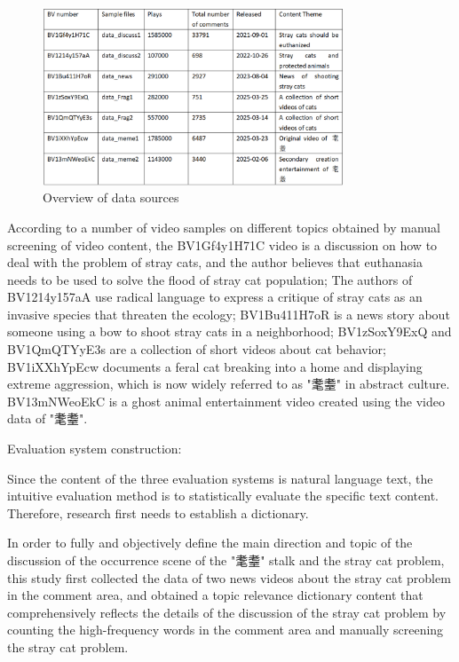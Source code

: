 \documentclass[12pt,a4paper]{ctexart}
\begin{document}
\begin{figure}[htbp]
    \centering
    \includegraphics[width=0.8\textwidth]{img/data_sources_2.png}
    \caption{Overview of data sources}
    \label{fig:data_sources_2}
\end{figure}
\newpage

According to a number of video samples on different topics obtained by manual screening of video content, the BV1Gf4y1H71C video is a discussion on how to deal with the problem of stray cats, and the author believes that euthanasia needs to be used to solve the flood of stray cat population; The authors of BV1214y157aA use radical language to express a critique of stray cats as an invasive species that threaten the ecology; BV1Bu411H7oR is a news story about someone using a bow to shoot stray cats in a neighborhood; BV1zSoxY9ExQ and BV1QmQTYyE3s are a collection of short videos about cat behavior; BV1iXXhYpEcw documents a feral cat breaking into a home and displaying extreme aggression, which is now widely referred to as "耄耋" in abstract culture. BV13mNWeoEkC is a ghost animal entertainment video created using the video data of "耄耋".

Evaluation system construction:

Since the content of the three evaluation systems is natural language text, the intuitive evaluation method is to statistically evaluate the specific text content. Therefore, research first needs to establish a dictionary.

In order to fully and objectively define the main direction and topic of the discussion of the occurrence scene of the "耄耋" stalk and the stray cat problem, this study first collected the data of two news videos about the stray cat problem in the comment area, and obtained a topic relevance dictionary content that comprehensively reflects the details of the discussion of the stray cat problem by counting the high-frequency words in the comment area and manually screening the stray cat problem.
\end{document}
